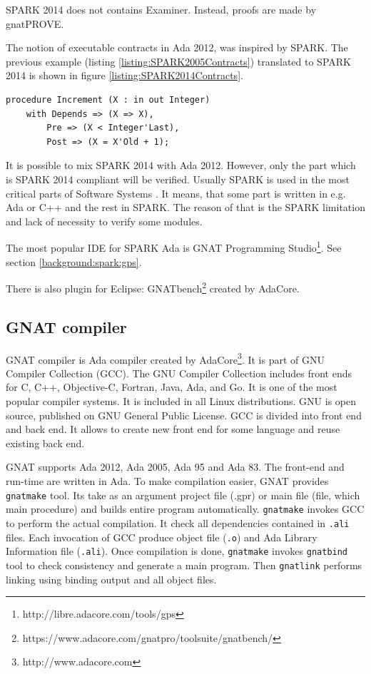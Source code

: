 SPARK 2014 does not contains Examiner. Instead, proofs are made by gnatPROVE.

The notion of executable contracts in Ada 2012, was inspired by SPARK. The previous example (listing \ref{listing:SPARK2005Contracts}) translated to SPARK 2014 is shown in figure \ref{listing:SPARK2014Contracts}.

\singlespacing
\begin{lstlisting}[language=ada2012, frame=single, gobble=0, caption={Sample SPARK 2014 procedure and Code Contracts}, label={listing:SPARK2014Contracts}]
	procedure Increment (X : in out Integer)
	with Depends => (X => X),
		Pre => (X < Integer'Last),
		Post => (X = X'Old + 1);
\end{lstlisting} 
\doublespacing

It is possible to mix SPARK 2014 with Ada 2012. However, only the part which is SPARK 2014 compliant will be verified. Usually SPARK is used in the most critical parts of Software Systems \cite{Spark:IndustrialExp}. It means, that some part is written in e.g. Ada or C++ and the rest in SPARK. The reason of that is the SPARK limitation and lack of necessity to verify some modules.

The most popular IDE for SPARK Ada is GNAT Programming Studio\footnote{http://libre.adacore.com/tools/gps}. See section \ref{background:spark:gps}.

There is also plugin for Eclipse: GNATbench\footnote{https://www.adacore.com/gnatpro/toolsuite/gnatbench/} created by AdaCore. 



\subsection{GNAT compiler}
\label{background:spark:gnat}

GNAT compiler is Ada compiler created by AdaCore\footnote{http://www.adacore.com}. It is part of GNU Compiler Collection (GCC). The GNU Compiler Collection includes front ends for C, C++, Objective-C, Fortran, Java, Ada, and Go. It is one of the most popular compiler systems. It is included in all Linux distributions. GNU is open source, published on GNU General Public License. GCC is divided into front end and back end. It allows to create new front end for some language and reuse existing back end.

GNAT supports Ada 2012, Ada 2005, Ada 95 and Ada 83. The front-end and run-time are written in Ada. To make compilation easier, GNAT provides \lstinline{gnatmake} tool. Its take as an argument project file (.gpr) or main file (file, which main procedure) and builds entire program automatically. \lstinline{gnatmake} invokes GCC to perform the actual compilation. It check all dependencies contained in \lstinline{.ali} files. Each invocation of GCC produce object file (\lstinline{.o}) and Ada Library Information file (\lstinline{.ali}). Once compilation is done, \lstinline{gnatmake} invokes \lstinline{gnatbind} tool to check consistency and generate a main program. Then \lstinline{gnatlink} performs linking using binding output and all object files.

